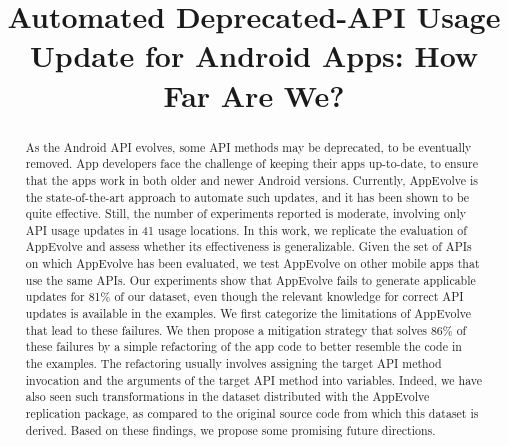 \documentclass[conference]{IEEEtran}
\begin{document}
\def \toolname {AppEvolve}
\title{Automated Deprecated-API Usage Update for Android Apps: How Far Are We?}

\author{

}

\maketitle

\begin{abstract}
As the Android API evolves, some API methods may be deprecated, to be
eventually removed.  App developers face the challenge of keeping their
apps up-to-date, to ensure that the apps work in both older and newer
Android versions.  Currently, AppEvolve is the state-of-the-art approach to
automate such updates, and it has been shown to be quite effective.  Still,
the number of experiments reported is moderate, involving only API usage
updates in 41 usage locations. In this work, we replicate the evaluation of
AppEvolve and assess whether its effectiveness is generalizable. Given the
set of APIs on which AppEvolve has been evaluated, we test AppEvolve on
other mobile apps that use the same APIs. Our experiments show that
AppEvolve fails to generate applicable updates for 81\% of our dataset,
even though the relevant knowledge for correct API updates is available in
the examples. We first categorize the limitations of AppEvolve that lead to
these failures.  We then propose a mitigation strategy that solves 86\%
of these failures by a simple refactoring of the app code to better
resemble the code in the examples. The refactoring usually involves
assigning the target API method invocation and the arguments of the target
API method into variables.  Indeed, we have also seen such transformations
in the dataset distributed with the AppEvolve replication package, as
compared to the original source code from which this dataset is derived.
Based on these findings, we propose some promising future directions.
\end{abstract}
\end{document}

